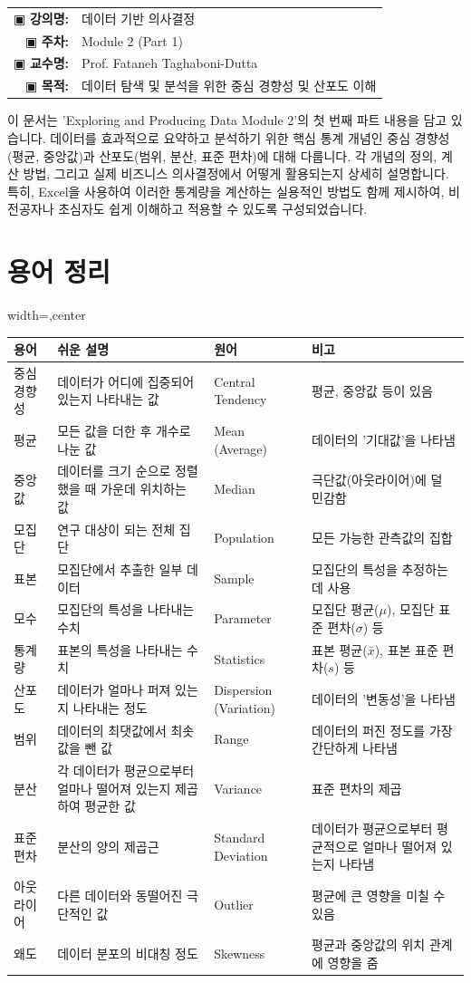 \documentclass[11pt,a4paper]{article}
\makeatletter
\theoremstyle{definition}
\newcommand{\metainfo}[4]{
\begin{tcolorbox}[
    colback=lightpurple,
    colframe=darkpurple,
    boxrule=1pt,
    arc=2mm,
    left=10pt,
    right=10pt,
    top=8pt,
    bottom=8pt
]
\begin{tabular}{@{}rl@{}}
▣ \textbf{강의명:} & #1 \\[0.3em]
▣ \textbf{주차:} & #2 \\[0.3em]
▣ \textbf{교수명:} & #3 \\[0.3em]
▣ \textbf{목적:} & \begin{minipage}[t]{0.75\textwidth}#4\end{minipage}
\end{tabular}
\end{tcolorbox}
}
\makeatother
\begin{document}
\thispagestyle{firstpage}

\metainfo{데이터 기반 의사결정}{Module 2 (Part 1)}{Prof. Fataneh Taghaboni-Dutta}{데이터 탐색 및 분석을 위한 중심 경향성 및 산포도 이해}

\tableofcontents

\newpage
\begin{overviewbox}
이 문서는 'Exploring and Producing Data Module 2'의 첫 번째 파트 내용을 담고 있습니다.
데이터를 효과적으로 요약하고 분석하기 위한 핵심 통계 개념인 중심 경향성(평균, 중앙값)과 산포도(범위, 분산, 표준 편차)에 대해 다룹니다.
각 개념의 정의, 계산 방법, 그리고 실제 비즈니스 의사결정에서 어떻게 활용되는지 상세히 설명합니다.
특히, Excel을 사용하여 이러한 통계량을 계산하는 실용적인 방법도 함께 제시하여, 비전공자나 초심자도 쉽게 이해하고 적용할 수 있도록 구성되었습니다.
\end{overviewbox}

\newpage
\section{용어 정리}
\begin{adjustbox}{width=\textwidth,center}
\begin{tabular}{llll}
\toprule
\textbf{용어} & \textbf{쉬운 설명} & \textbf{원어} & \textbf{비고} \\
\midrule
중심 경향성 & 데이터가 어디에 집중되어 있는지 나타내는 값 & Central Tendency & 평균, 중앙값 등이 있음 \\
평균 & 모든 값을 더한 후 개수로 나눈 값 & Mean (Average) & 데이터의 '기대값'을 나타냄 \\
중앙값 & 데이터를 크기 순으로 정렬했을 때 가운데 위치하는 값 & Median & 극단값(아웃라이어)에 덜 민감함 \\
모집단 & 연구 대상이 되는 전체 집단 & Population & 모든 가능한 관측값의 집합 \\
표본 & 모집단에서 추출한 일부 데이터 & Sample & 모집단의 특성을 추정하는 데 사용 \\
모수 & 모집단의 특성을 나타내는 수치 & Parameter & 모집단 평균($\mu$), 모집단 표준 편차($\sigma$) 등 \\
통계량 & 표본의 특성을 나타내는 수치 & Statistics & 표본 평균($\bar{x}$), 표본 표준 편차($s$) 등 \\
산포도 & 데이터가 얼마나 퍼져 있는지 나타내는 정도 & Dispersion (Variation) & 데이터의 '변동성'을 나타냄 \\
범위 & 데이터의 최댓값에서 최솟값을 뺀 값 & Range & 데이터의 퍼진 정도를 가장 간단하게 나타냄 \\
분산 & 각 데이터가 평균으로부터 얼마나 떨어져 있는지 제곱하여 평균한 값 & Variance & 표준 편차의 제곱 \\
표준 편차 & 분산의 양의 제곱근 & Standard Deviation & 데이터가 평균으로부터 평균적으로 얼마나 떨어져 있는지 나타냄 \\
아웃라이어 & 다른 데이터와 동떨어진 극단적인 값 & Outlier & 평균에 큰 영향을 미칠 수 있음 \\
왜도 & 데이터 분포의 비대칭 정도 & Skewness & 평균과 중앙값의 위치 관계에 영향을 줌 \\
\bottomrule
\end{tabular}
\end{adjustbox}
\end{document}
